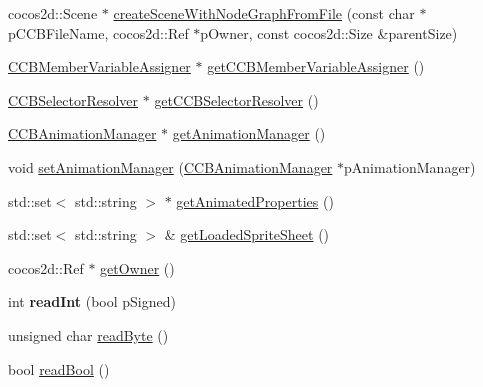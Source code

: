 \begin{DoxyCompactItemize}
\item 
cocos2d\+::\+Scene $\ast$ \hyperlink{classcocosbuilder_1_1CCBReader_a68fe74e233137eb272352fadd05c5fb0}{create\+Scene\+With\+Node\+Graph\+From\+File} (const char $\ast$p\+C\+C\+B\+File\+Name, cocos2d\+::\+Ref $\ast$p\+Owner, const cocos2d\+::\+Size \&parent\+Size)
\item 
\hyperlink{classcocosbuilder_1_1CCBMemberVariableAssigner}{C\+C\+B\+Member\+Variable\+Assigner} $\ast$ \hyperlink{classcocosbuilder_1_1CCBReader_afbd8d7c837ee80e9f20f16fd7f313bce}{get\+C\+C\+B\+Member\+Variable\+Assigner} ()
\item 
\hyperlink{classcocosbuilder_1_1CCBSelectorResolver}{C\+C\+B\+Selector\+Resolver} $\ast$ \hyperlink{classcocosbuilder_1_1CCBReader_a323ddc1b95bc697512dd6fce70127cc0}{get\+C\+C\+B\+Selector\+Resolver} ()
\item 
\hyperlink{classcocosbuilder_1_1CCBAnimationManager}{C\+C\+B\+Animation\+Manager} $\ast$ \hyperlink{classcocosbuilder_1_1CCBReader_a37e7586fbbc087544d436a73ba9c0429}{get\+Animation\+Manager} ()
\item 
void \hyperlink{classcocosbuilder_1_1CCBReader_ac942b72ca6dd452c87f97525c1c16844}{set\+Animation\+Manager} (\hyperlink{classcocosbuilder_1_1CCBAnimationManager}{C\+C\+B\+Animation\+Manager} $\ast$p\+Animation\+Manager)
\item 
std\+::set$<$ std\+::string $>$ $\ast$ \hyperlink{classcocosbuilder_1_1CCBReader_a6516fc198035778d69618429114506ce}{get\+Animated\+Properties} ()
\item 
std\+::set$<$ std\+::string $>$ \& \hyperlink{classcocosbuilder_1_1CCBReader_a584614c2aa36dab6f0480ffa21d2eecb}{get\+Loaded\+Sprite\+Sheet} ()
\item 
cocos2d\+::\+Ref $\ast$ \hyperlink{classcocosbuilder_1_1CCBReader_a679162b3027ebb31b58b1f3ba2d0f4ff}{get\+Owner} ()
\item 
\mbox{\label{classcocosbuilder_1_1CCBReader_a5ed99bb90a5a868a970404b826049e74}} 
int {\bfseries read\+Int} (bool p\+Signed)
\item 
unsigned char \hyperlink{classcocosbuilder_1_1CCBReader_abe30f2edc0c4ba199aaa0cde85b07cd7}{read\+Byte} ()
\item 
bool \hyperlink{classcocosbuilder_1_1CCBReader_ab343ee1b1aafa4ce9b223563cb0b1db2}{read\+Bool} ()
\item 
\mbox{\label{classcocosbuilder_1_1CCBReader_a7b7e7ae85e89f660aa5301dd33433dec}} 

\end{DoxyCompactItemize}
